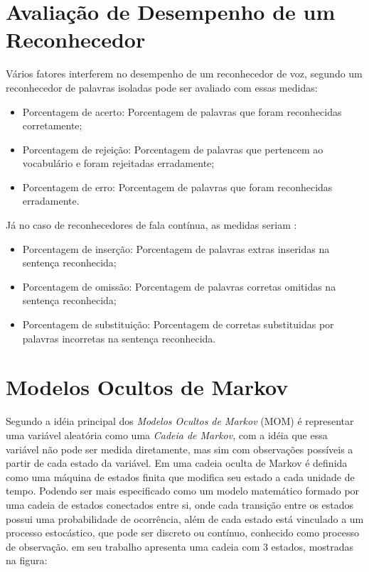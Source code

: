 \section{Avaliação de Desempenho de um Reconhecedor}
Vários fatores interferem no desempenho de um reconhecedor de voz, segundo  um reconhecedor de palavras isoladas pode ser avaliado com essas medidas:

\begin{itemize}
\item Porcentagem de acerto: Porcentagem de palavras que foram reconhecidas corretamente;
\item Porcentagem de rejeição: Porcentagem de palavras que pertencem ao vocabulário e foram rejeitadas erradamente;
\item Porcentagem de erro: Porcentagem de palavras que foram reconhecidas erradamente.
\end{itemize}

Já no caso de reconhecedores de fala contínua, as medidas seriam \cite{AvaliaTecJose}:
\begin{itemize}
\item Porcentagem de inserção: Porcentagem de palavras extras inseridas na sentença reconhecida;
\item Porcentagem de omissão: Porcentagem de palavras corretas omitidas na sentença reconhecida;
\item Porcentagem de substituição: Porcentagem de corretas substituidas por palavras incorretas na sentença reconhecida.
\end{itemize}

\section{Modelos Ocultos de Markov}
Segundo  a idéia principal dos \textit{Modelos Ocultos de Markov} (MOM) é representar uma variável aleatória como uma \textit{Cadeia de Markov}, com a idéia que essa variável não pode ser medida diretamente, mas sim com observações possíveis a partir de cada estado da variável. Em  uma cadeia oculta de Markov é definida como uma máquina de estados finita que modifica seu estado a cada unidade de tempo. Podendo ser mais especificado como um modelo matemático formado por uma cadeia de estados conectados entre si, onde cada transição entre os estados possui uma probabilidade de ocorrência, além de cada estado está vinculado a um processo estocástico, que pode ser discreto ou contínuo, conhecido como processo de observação.
 em seu trabalho apresenta uma cadeia com 3 estados, mostradas na figura:

